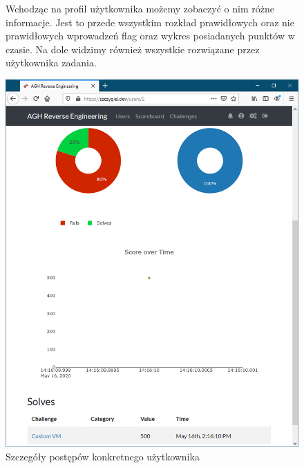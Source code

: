 \documentclass[polish,12pt]{aghthesis}
\begin{document}
\begin{figure}[ht]
    Wchodząc na profil użytkownika możemy zobaczyć o nim różne informacje.
    Jest to przede wszystkim rozkład prawidłowych oraz nie prawidłowych
    wprowadzeń flag oraz wykres posiadanych punktów w czasie.
    Na dole widzimy również wszystkie rozwiązane przez użytkownika zadania.

    \vspace{1cm}

    \centering
    \includegraphics[width=14cm]{szczygiel_dev_user_info}
    \caption{Szczegóły postępów konkretnego użytkownika}
    \label{fig:szczygiel_dev_user_info}
\end{figure}
\end{document}
